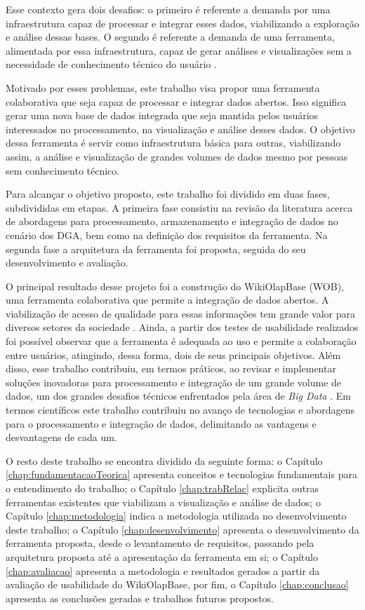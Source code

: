 Esse contexto gera dois desafios: o primeiro é referente a demanda por uma infraestrutura 
capaz de processar e integrar esses dados, viabilizando a exploração e análise dessas bases. 
O segundo é referente a demanda de uma ferramenta, alimentada por essa infraestrutura, capaz 
de gerar análises e visualizações sem a necessidade de conhecimento técnico do usuário 
\cite{graves2013}.

Motivado por esses problemas, este trabalho visa propor uma ferramenta colaborativa que 
seja capaz de processar e integrar dados abertos. Isso significa gerar uma 
nova base de dados integrada que seja mantida pelos usuários interessados no processamento, 
na visualização e análise desses dados. O objetivo dessa ferramenta é servir como 
infraestrutura básica para outras, viabilizando assim, a análise e visualização de grandes 
volumes de dados mesmo por pessoas sem conhecimento técnico. 

Para alcançar o objetivo proposto, este trabalho foi dividido em duas fases, subdivididas 
em etapas. A primeira fase consistiu na revisão da literatura acerca de abordagens para 
processamento, armazenamento e integração de dados no cenário dos DGA, bem como na definição 
dos requisitos da ferramenta. Na segunda fase a arquitetura da ferramenta foi proposta, 
seguida do seu desenvolvimento e avaliação.

O principal resultado desse projeto foi a construção do WikiOlapBase (WOB), uma ferramenta 
colaborativa que permite a integração de dados abertos. A viabilização de acesso de qualidade 
para essas informações tem grande valor para diversos setores da sociedade \cite{vaz2010dados}. 
Ainda, a partir dos testes de usabilidade realizados foi possível observar que a ferramenta é 
adequada ao uso e permite a colaboração entre usuários, atingindo, dessa forma, dois de seus
principais objetivos. Além disso, esse trabalho contribuiu, em termos práticos, ao revisar e 
implementar soluções inovadoras para processamento e integração de um grande volume de dados, 
um dos grandes desafios técnicos enfrentados pela área de \textit{Big Data} 
\cite{jagadish2014}. Em termos científicos este trabalho contribuiu no avanço de 
tecnologias e abordagens para o processamento e integração de dados, delimitando as 
vantagens e desvantagens de cada um.

O resto deste trabalho se encontra dividido da seguinte forma: o Capítulo 
\ref{chap:fundamentacaoTeorica} apresenta conceitos e tecnologias fundamentais para o 
entendimento do trabalho; o Capítulo \ref{chap:trabRelac} explicita outras ferramentas 
existentes que viabilizam a visualização e análise de dados; o Capítulo \ref{chap:metodologia} 
indica a metodologia utilizada no desenvolvimento deste trabalho; o Capítulo 
\ref{chap:desenvolvimento} apresenta o desenvolvimento da ferramenta proposta, desde o 
levantamento de requisitos, passando pela arquitetura proposta até a apresentação da 
ferramenta em si; o Capítulo \ref{chap:avaliacao} apresenta a metodologia e resultados 
gerados a partir da avaliação de usabilidade do WikiOlapBase, por fim, o Capítulo 
\ref{chap:conclusao} apresenta as conclusões geradas e trabalhos futuros propostos.